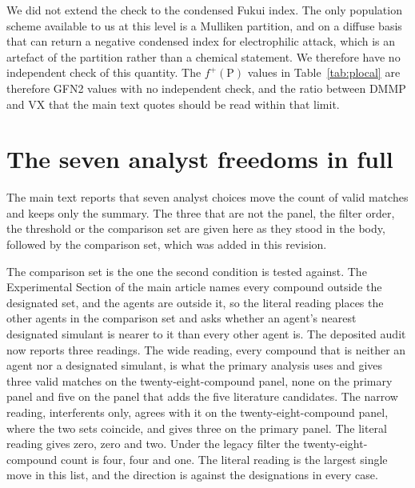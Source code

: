 \documentclass[journal=jacsat,manuscript=suppinfo,margin=1in]{achemso}
\begin{document}
We did not extend the check to the condensed Fukui index. The only population
scheme available to us at this level is a Mulliken partition, and on a diffuse
basis that can return a negative condensed index for electrophilic attack, which
is an artefact of the partition rather than a chemical statement. We therefore
have no independent check of this quantity. The
$f^{+}(\mathrm{P})$ values in Table~\ref{tab:plocal} are therefore GFN2 values
with no independent check, and the ratio between DMMP and VX that the main text
quotes should be read within that limit.

\section{The seven analyst freedoms in full}
\label{res:freedoms}

The main text reports that seven analyst choices move the count of valid
matches and keeps only the summary. The three that are not the panel, the
filter order, the threshold or the comparison set are given here as they stood
in the body, followed by the comparison set, which was added in this revision.

The comparison set is the one the second condition is tested against. The
Experimental Section of the main article names every compound outside the
designated set, and the agents are outside it, so the literal reading places
the other agents in the comparison set and asks whether an agent's nearest
designated simulant is nearer to it than every other agent is. The deposited
audit now reports three readings. The wide reading, every compound that is
neither an agent nor a designated simulant, is what the primary analysis uses
and gives three valid matches on the twenty-eight-compound panel, none on the
primary panel and five on the panel that adds the five literature candidates.
The narrow reading, interferents only, agrees with it on the
twenty-eight-compound panel, where the two sets coincide, and gives three on
the primary panel. The literal reading gives zero, zero and two. Under the
legacy filter the twenty-eight-compound count is four, four and one. The
literal reading is the largest single move in this list, and the direction is
against the designations in every case.
\end{document}
